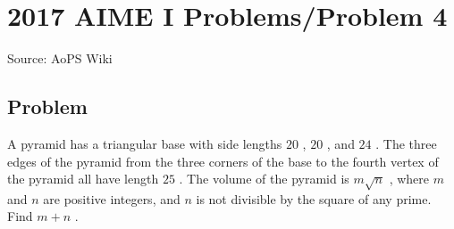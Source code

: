 \documentclass[12pt]{article}
\begin{document}
\section*{{2017 AIME I Problems/Problem 4}}
Source: AoPS Wiki

\subsection*{Problem}
A pyramid has a triangular base with side lengths $20$ , $20$ , and $24$ . The three edges of the pyramid from the three corners of the base to the fourth vertex of the pyramid all have length $25$ . The volume of the pyramid is $m\sqrt{n}$ , where $m$ and $n$ are positive integers, and $n$ is not divisible by the square of any prime. Find $m+n$ .
\end{document}
